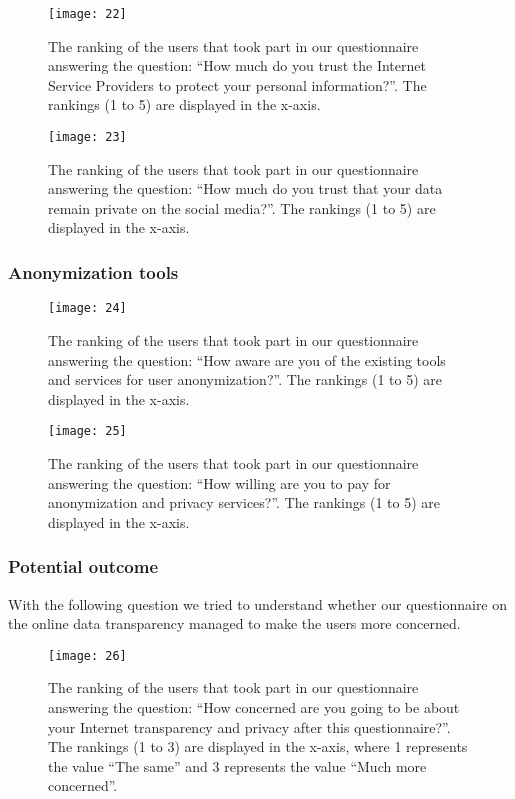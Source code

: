 \begin{figure}[hp]
\centering
\texttt{[image: 22]}
\caption{The ranking of the users that took part in our questionnaire answering
the question: ``How much do you trust the Internet Service Providers to protect 
your personal information?''. The rankings (1 to 5) are displayed in the x-axis.}
\end{figure}

\begin{figure}[hp]
\centering
\texttt{[image: 23]}
\caption{The ranking of the users that took part in our questionnaire answering
the question: ``How much do you trust that your data remain private on the 
social media?''. The rankings (1 to 5) are displayed in the x-axis.}
\end{figure}

\subsubsection{Anonymization tools}

\begin{figure}[hp]
\centering
\texttt{[image: 24]}
\caption{The ranking of the users that took part in our questionnaire answering
the question: ``How aware are you of the existing tools and services for user 
anonymization?''. The rankings (1 to 5) are displayed in the x-axis.}
\end{figure}

\begin{figure}[hp]
\centering
\texttt{[image: 25]}
\caption{The ranking of the users that took part in our questionnaire answering
the question: ``How willing are you to pay for anonymization and privacy 
services?''. The rankings (1 to 5) are displayed in the x-axis.}
\end{figure}

\subsubsection{Potential outcome}

With the following question we tried to understand whether our questionnaire on 
the online data transparency managed to make the users more concerned.  

\begin{figure}[hp]
\centering
\texttt{[image: 26]}
\caption{The ranking of the users that took part in our questionnaire answering
the question: ``How concerned are you going to be about your Internet 
transparency and privacy after this questionnaire?''. The
rankings (1 to 3) are displayed in the x-axis, where 1 represents the value 
``The same'' and 3 represents the value ``Much more concerned''.}
\end{figure}

